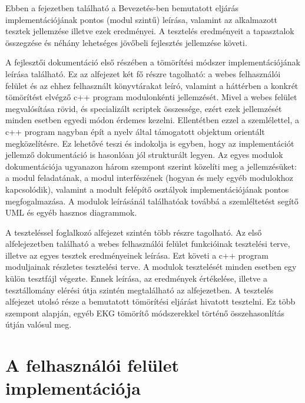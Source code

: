 \documentclass[oneside,titlepage,12pt,a4paper]{report}
\begin{document}
Ebben a fejezetben található a Bevezetés-ben bemutatott eljárás implementációjának pontos (modul szintű) leírása, valamint az alkalmazott tesztek jellemzése illetve ezek eredményei. A tesztelés eredményeit a tapasztalok összegzése és néhány lehetséges jövőbeli fejlesztés jellemzése követi. \par A fejlesztői dokumentáció első részében a tömörítési módszer implementációjának leírása található. Ez az alfejezet két fő részre tagolható: a webes felhasználói felület és az ehhez felhasznált könyvtárakat leíró, valamint a háttérben a konkrét tömörítést elvégző c++ program modulonkénti jellemzését. Mivel a webes felület megvalósítása rövid, és specializált scriptek összessége, ezért ezek jellemzését minden esetben egyedi módon érdemes kezelni. Ellentétben ezzel a szemlélettel, a c++ program nagyban épít a nyelv által támogatott objektum orientált megközelítésre. Ez lehetővé teszi és indokolja is egyben, hogy az implementációt jellemző dokumentáció is hasonlóan jól strukturált legyen. Az egyes modulok dokumentációja ugyanazon három szempont szerint közelíti meg a jellemzésüket: a modul feladatának, a modul interfészének (hogyan és mely egyéb modulokhoz kapcsolódik), valamint a modult felépítő osztályok implementációjának pontos megfogalmazása. A modulok leírásánál találhatóak továbbá a szemléltetést segítő UML és egyéb hasznos diagrammok. 
\par  A teszteléssel foglalkozó alfejezet szintén több részre tagolható. Az első alfelejezetben található a webes felhasználói felület funkcióinak tesztelési terve, illetve az egyes tesztek eredményeinek leírása. Ezt követi a c++ program moduljainak részletes tesztelési terve. A modulok tesztelését minden esetben egy külön tesztfájl végezte. Ennek leírása, az eredmények értékelése, illetve a tesztállomány elérési útja szintén megtalálható az alfejezetben. A  tesztelés alfejezet utolsó része a bemutatott tömörítési eljárást hivatott tesztelni. Ez több szempont alapján, egyéb EKG tömörítő módszerekkel történő összehasonlítás útján valósul meg. 

\section{A felhasználói felület implementációja}
\end{document}
